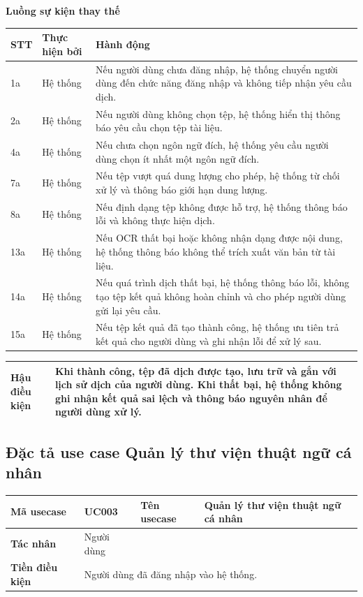 \documentclass[../DoAn.tex]{subfiles}
\begin{document}
\textbf{Luồng sự kiện thay thế}

\begin{longtable}{|p{1cm}|p{3.3cm}|p{10.2cm}|}
\hline
\textbf{STT} & \textbf{Thực hiện bởi} & \textbf{Hành động} \\ \hline
1a & Hệ thống & Nếu người dùng chưa đăng nhập, hệ thống chuyển người dùng đến chức năng đăng nhập và không tiếp nhận yêu cầu dịch. \\ \hline
2a & Hệ thống & Nếu người dùng không chọn tệp, hệ thống hiển thị thông báo yêu cầu chọn tệp tài liệu. \\ \hline
4a & Hệ thống & Nếu chưa chọn ngôn ngữ đích, hệ thống yêu cầu người dùng chọn ít nhất một ngôn ngữ đích. \\ \hline
7a & Hệ thống & Nếu tệp vượt quá dung lượng cho phép, hệ thống từ chối xử lý và thông báo giới hạn dung lượng. \\ \hline
8a & Hệ thống & Nếu định dạng tệp không được hỗ trợ, hệ thống thông báo lỗi và không thực hiện dịch. \\ \hline
13a & Hệ thống & Nếu OCR thất bại hoặc không nhận dạng được nội dung, hệ thống thông báo không thể trích xuất văn bản từ tài liệu. \\ \hline
14a & Hệ thống & Nếu quá trình dịch thất bại, hệ thống thông báo lỗi, không tạo tệp kết quả không hoàn chỉnh và cho phép người dùng gửi lại yêu cầu. \\ \hline
15a & Hệ thống & Nếu tệp kết quả đã tạo thành công, hệ thống ưu tiên trả kết quả cho người dùng và ghi nhận lỗi để xử lý sau. \\ \hline
\end{longtable}

\begin{longtable}{|p{4cm}|p{10.5cm}|}
\hline
\textbf{Hậu điều kiện} & Khi thành công, tệp đã dịch được tạo, lưu trữ và gắn với lịch sử dịch của người dùng. Khi thất bại, hệ thống không ghi nhận kết quả sai lệch và thông báo nguyên nhân để người dùng xử lý. \\ \hline
\end{longtable}

\subsection{Đặc tả use case Quản lý thư viện thuật ngữ cá nhân}

\begin{longtable}{|p{3cm}|p{4cm}|p{3cm}|p{4.5cm}|}
\hline
\textbf{Mã usecase} & UC003 & \textbf{Tên usecase} & Quản lý thư viện thuật ngữ cá nhân \\ \hline
\textbf{Tác nhân} & Người dùng & & \\ \hline
\textbf{Tiền điều kiện} & \multicolumn{3}{p{11.5cm}|}{Người dùng đã đăng nhập vào hệ thống.} \\ \hline
\end{longtable}
\end{document}
